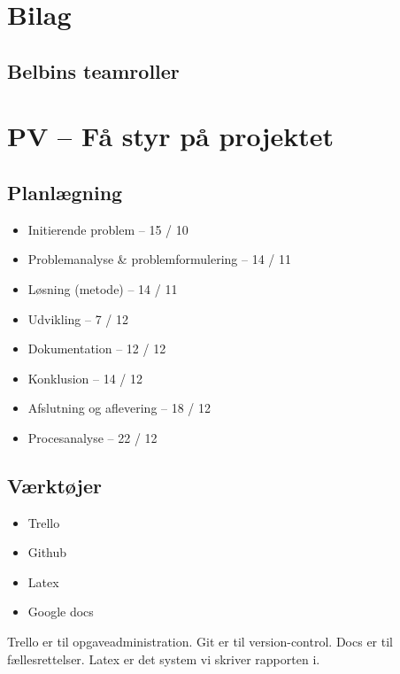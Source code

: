 \documentclass[oneside,a4paper,titlepage]{article}
\begin{document}
\clearpage
\section{Bilag}
\subsection{Belbins teamroller}
\label{sec:styr_paa_projektet}
\section*{PV – Få styr på projektet}
\subsection*{Planlægning}
\begin{itemize}
  \item Initierende problem – 15 / 10
  \item Problemanalyse \& problemformulering – 14 / 11
  \item Løsning (metode) – 14 / 11
  \item Udvikling – 7 / 12
  \item Dokumentation – 12 / 12
  \item Konklusion – 14 / 12
  \item Afslutning og aflevering – 18 / 12
  \item Procesanalyse – 22 / 12
\end{itemize}

\subsection*{Værktøjer}
\begin{itemize}
  \item Trello
  \item Github
  \item Latex
  \item Google docs
\end{itemize}
Trello er til opgaveadministration.
Git er til version-control.
Docs er til fællesrettelser.
Latex er det system vi skriver rapporten i.
\end{document}
